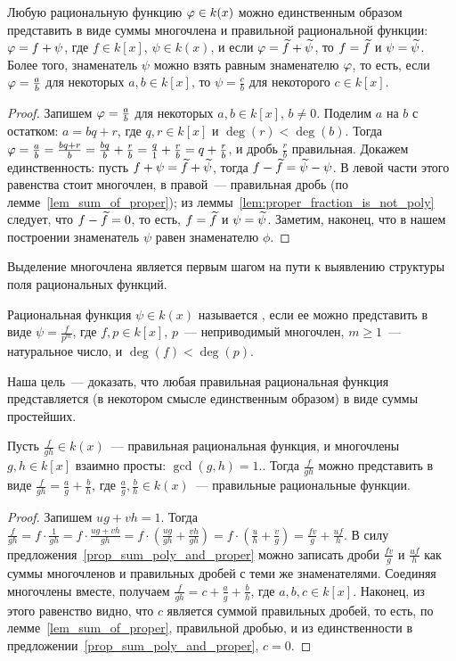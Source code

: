 \begin{proposition}\label{prop_sum_poly_and_proper}
Любую рациональную функцию $\varphi\in k(x)$ можно единственным образом
представить в виде суммы многочлена и правильной рациональной функции:
$\varphi=f+\psi$, где $f\in k[x]$, $\psi\in k(x)$, и если
$\varphi=\widetilde{f}+\widetilde{\psi}$, то $f=\widetilde{f}$ и $\psi=\widetilde{\psi}$. Более
того, знаменатель $\psi$ можно взять равным знаменателю $\varphi$, то
есть, если $\varphi=\frac{a}{b}$ для некоторых $a,b\in k[x]$, то
$\psi=\frac{c}{b}$ для некоторого $c\in k[x]$.
\end{proposition}
\begin{proof}
Запишем $\varphi=\frac{a}{b}$ для некоторых $a,b\in k[x]$, $b\neq 0$. Поделим $a$ на
$b$ с остатком: $a=bq+r$,  где $q,r\in k[x]$ и $\deg(r)<\deg(b)$. Тогда
$\varphi=\frac{a}{b}=\frac{bq+r}{b}=\frac{bq}{b}+\frac{r}{b}=\frac{q}{1}+\frac{r}{b}=q+\frac{r}{b}$,
и дробь $\frac{r}{b}$ правильная.
Докажем единственность:
пусть $f+\psi=\widetilde{f}+\widetilde{\psi}$,
тогда $f-\widetilde{f}=\widetilde{\psi}-\psi$. В левой части этого равенства стоит
многочлен, в правой~--- правильная дробь (по лемме~\ref{lem_sum_of_proper});
из леммы~\ref{lem:proper_fraction_is_not_poly} следует,
что $f - \widetilde{f}=0$, то есть, $f=\widetilde{f}$ и $\psi = \widetilde{\psi}$.
Заметим, наконец, что в нашем построении знаменатель $\psi$ равен
знаменателю $\phi$.
\end{proof}

Выделение многочлена является первым шагом на пути к выявлению
структуры поля рациональных функций.

\begin{definition}
Рациональная функция $\psi\in k(x)$ называется
, если ее можно представить в
виде
$\psi=\frac{f}{p^m}$, где $f,p\in k[x]$, $p$~--- неприводимый
многочлен, $m\geq 1$~--- натуральное число, и $\deg(f)<\deg(p)$.
\end{definition}

Наша цель~--- доказать, что любая правильная рациональная функция
представляется  (в некотором смысле единственным образом) в виде суммы
простейших.

\begin{lemma}\label{prop_coprime_denominators}
Пусть $\frac{f}{gh}\in k(x)$~--- правильная рациональная функция, и
многочлены $g,h\in k[x]$ взаимно просты: $\gcd(g,h)=1$.. Тогда
$\frac{f}{gh}$ можно представить в виде
$\frac{f}{gh}=\frac{a}{g}+\frac{b}{h}$, где
$\frac{a}{g},\frac{b}{h}\in k(x)$~--- правильные рациональные
функции.
\end{lemma}
\begin{proof}
Запишем $ug+vh=1$. Тогда
$\frac{f}{gh}=f\cdot\frac{1}{gh}=f\cdot\frac{ug+vh}{gh}=f\cdot(\frac{ug}{gh}+\frac{vh}{gh})=f\cdot(\frac{u}{h}+\frac{v}{g})=\frac{fv}{g}+\frac{uf}{h}$. В
силу предложения~\ref{prop_sum_poly_and_proper} можно записать дроби
$\frac{fv}{g}$ и $\frac{uf}{h}$ как суммы многочленов и правильных
дробей с теми же знаменателями. Соединяя многочлены вместе, получаем
$\frac{f}{gh}=c+\frac{a}{g}+\frac{b}{h}$, где $a,b,c\in
k[x]$. Наконец, из этого равенство видно, что $c$ является суммой
правильных дробей, то есть, по лемме~\ref{lem_sum_of_proper},
правильной дробью, и из единственности в
предложении~\ref{prop_sum_poly_and_proper}, $c=0$.
\end{proof}

